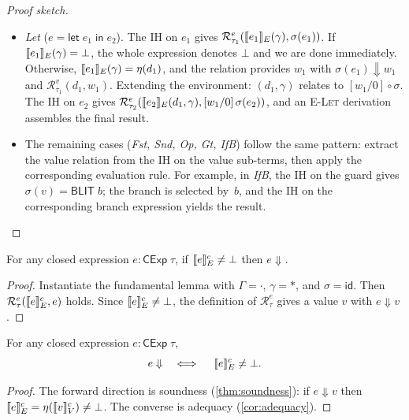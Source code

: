 \begin{proof}[Proof sketch]
\begin{itemize}
  \item \emph{Let} ($e = \mathsf{let}\;e_1\;\mathsf{in}\;e_2$).
    The IH on $e_1$ gives
    $\mathcal{R}^e_{\tau_1}(\llbracket e_1 \rrbracket_E(\gamma), \sigma(e_1))$.
    If $\llbracket e_1 \rrbracket_E(\gamma) = \bot$, the whole expression denotes
    $\bot$ and we are done immediately.  Otherwise,
    $\llbracket e_1 \rrbracket_E(\gamma) = \eta(d_1)$, and the relation provides
    $w_1$ with $\sigma(e_1) \Downarrow w_1$ and
    $\mathcal{R}^v_{\tau_1}(d_1, w_1)$.  Extending the environment:
    $(d_1, \gamma)$ relates to $[w_1/0] \circ \sigma$.  The IH on $e_2$
    gives
    $\mathcal{R}^e_{\tau_2}(\llbracket e_2 \rrbracket_E(d_1, \gamma),
    [w_1/0]\,\sigma(e_2))$, and an \textsc{E-Let} derivation assembles
    the final result.

  \item The remaining cases (\emph{Fst, Snd, Op, Gt, IfB}) follow the
    same pattern: extract the value relation from the IH on the value
    sub-terms, then apply the corresponding evaluation rule.  For
    example, in \emph{IfB}, the IH on the guard gives
    $\sigma(v) = \mathsf{BLIT}\;b$; the branch is selected by~$b$,
    and the IH on the corresponding branch expression yields the result.
\end{itemize}
\vspace{-0.5em}
\end{proof}

\begin{corollary}[Adequacy]
\label{cor:adequacy}
For any closed expression $e : \mathsf{CExp}\;\tau$, if\/
$\llbracket e \rrbracket^c_E \neq \bot$ then $e \Downarrow$.
\end{corollary}
\begin{proof}
Instantiate the fundamental lemma with $\Gamma = \cdot$, $\gamma =
\ast$, and $\sigma = \mathsf{id}$.  Then
$\mathcal{R}^e_\tau(\llbracket e \rrbracket^c_E, e)$ holds.  Since $\llbracket e \rrbracket^c_E \neq
\bot$, the definition of $\mathcal{R}^e_\tau$ gives a value $v$ with
$e \Downarrow v$.
\end{proof}

\begin{theorem}
\label{thm:full-correspondence}
For any closed expression $e : \mathsf{CExp}\;\tau$,
\[
  e \Downarrow \quad\iff\quad \llbracket e \rrbracket^c_E \neq \bot.
\]
\end{theorem}
\begin{proof}
The forward direction is soundness (\cref{thm:soundness}): if
$e \Downarrow v$ then $\llbracket e \rrbracket^c_E = \eta(\llbracket v \rrbracket^c_V) \neq \bot$.
The converse is adequacy (\cref{cor:adequacy}).
\end{proof}

